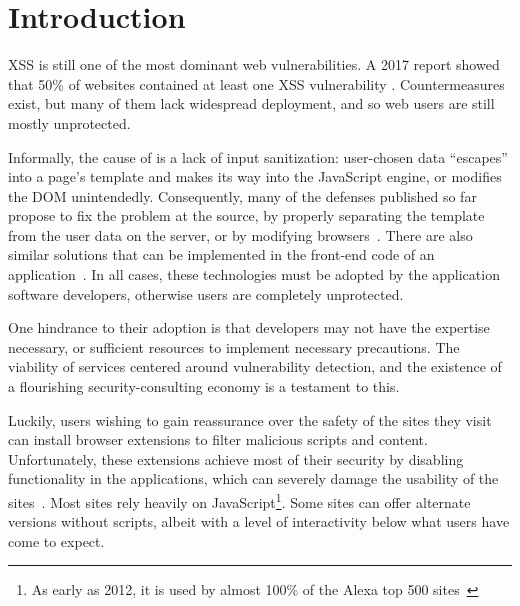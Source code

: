 \section{Introduction} \label{introduction}

\ac{XSS} is still one of the most dominant web vulnerabilities. A 2017
report showed that 50\% of websites contained at least one \ac{XSS}
vulnerability \cite{Acunetix}. Countermeasures exist, but many of them
lack widespread deployment, and so web users are still mostly
unprotected.

Informally, the cause of \xss is a lack of input sanitization:
user-chosen data ``escapes'' into a page's template and makes its way
into the JavaScript engine, or modifies the DOM
unintendedly.
%
Consequently, many of the \xss defenses published so far
propose to fix the problem at the source, by properly separating the
template from the user data on the server, or by modifying
browsers~\cite{Jim:2007:DSI:1242572.1242654,Nadji:2009,Wurzinger:2009:SMX:1656360.1656379,Sundareswaran:2012:XHS:2352970.2352994}.
%
There are also similar solutions that can be implemented in the
front-end code of an application~\cite{10.1007/978-3-319-66399-9_7}.
In all cases, these technologies must be adopted by the application
software developers, otherwise users are completely unprotected.

One hindrance to their adoption is that developers may not have the
expertise necessary, or sufficient resources to implement necessary
precautions.
The viability of services centered around vulnerability detection,
and the existence of a flourishing security-consulting economy
is a testament to this.


Luckily, users wishing to gain reassurance over the safety of the
sites they visit can install browser extensions to filter malicious
scripts and content. Unfortunately, these extensions achieve most of
their security by disabling functionality in the applications, which
can severely damage the usability of the
sites~\cite{Noscript,Snyder:2017:MWD:3133956.3133966}. Most sites rely
heavily on JavaScript\footnote{As early as 2012, it is used by almost
  100\% of the Alexa top 500
  sites~\cite{Stock:2017:WTI:3241189.3241265}}. Some sites can offer
alternate versions without scripts, albeit with a level of interactivity below
what users have come to expect.

